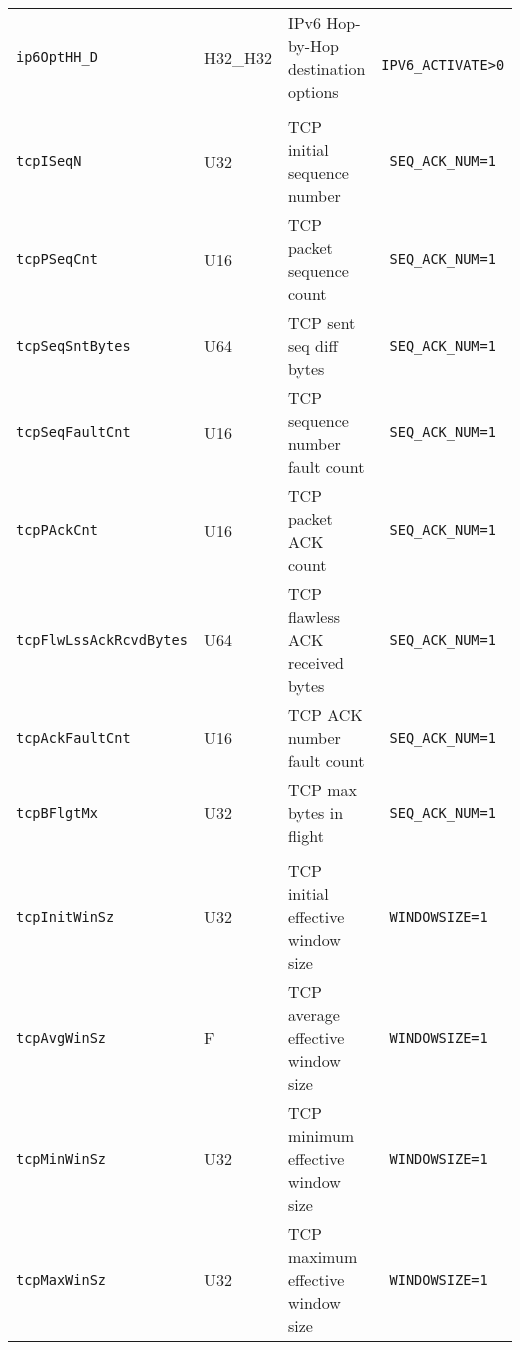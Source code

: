 \documentclass[documentation]{subfiles}
\begin{document}
\begin{longtable}{>{\tt}lll>{\tt\small}l}
    ip6OptHH\_D                      & H32\_H32   & IPv6 Hop-by-Hop destination options                   & IPV6\_ACTIVATE>0\\
    \\
    tcpISeqN                         & U32        & TCP initial sequence number                           & SEQ\_ACK\_NUM=1\\
    tcpPSeqCnt                       & U16        & TCP packet sequence count                             & SEQ\_ACK\_NUM=1\\
    tcpSeqSntBytes                   & U64        & TCP sent seq diff bytes                               & SEQ\_ACK\_NUM=1\\
    tcpSeqFaultCnt                   & U16        & TCP sequence number fault count                       & SEQ\_ACK\_NUM=1\\
    tcpPAckCnt                       & U16        & TCP packet ACK count                                  & SEQ\_ACK\_NUM=1\\
    tcpFlwLssAckRcvdBytes            & U64        & TCP flawless ACK received bytes                       & SEQ\_ACK\_NUM=1\\
    tcpAckFaultCnt                   & U16        & TCP ACK number fault count                            & SEQ\_ACK\_NUM=1\\
    tcpBFlgtMx                       & U32        & TCP max bytes in flight                               & SEQ\_ACK\_NUM=1\\
    \\
    tcpInitWinSz                     & U32        & TCP initial effective window size                     & WINDOWSIZE=1\\
    tcpAvgWinSz                      &   F        & TCP average effective window size                     & WINDOWSIZE=1\\
    tcpMinWinSz                      & U32        & TCP minimum effective window size                     & WINDOWSIZE=1\\
    tcpMaxWinSz                      & U32        & TCP maximum effective window size                     & WINDOWSIZE=1\\

\end{longtable}
\end{document}
